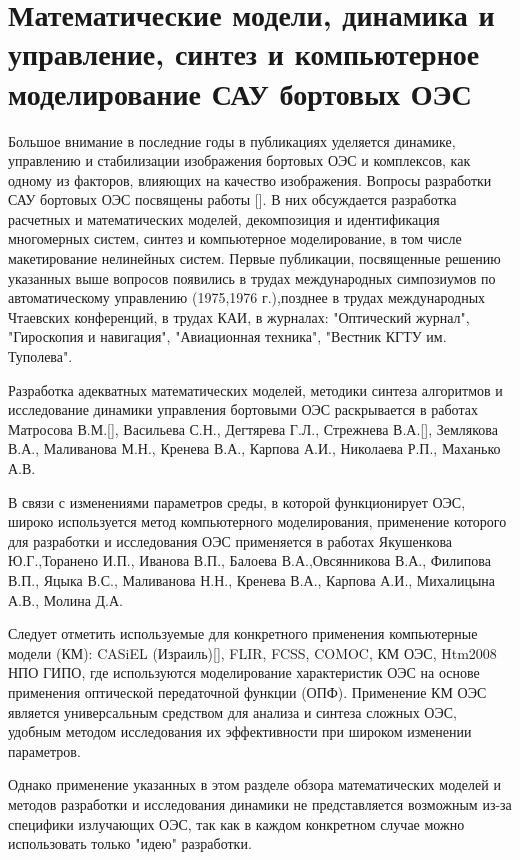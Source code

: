 \section{Математические модели, динамика и управление, синтез и компьютерное моделирование САУ бортовых ОЭС} \label{sec:ch1/modeling}

Большое внимание в последние годы в публикациях уделяется динамике, управлению и стабилизации изображения бортовых ОЭС и комплексов, как одному из факторов, влияющих на качество изображения. Вопросы разработки САУ бортовых ОЭС посвящены работы []. В них обсуждается разработка расчетных и математических моделей, декомпозиция и идентификация многомерных систем, синтез и компьютерное моделирование, в том числе макетирование нелинейных систем. Первые публикации, посвященные решению указанных выше вопросов появились в трудах международных симпозиумов по автоматическому управлению (1975,1976 г.),позднее в трудах международных Чтаевских конференций, в трудах КАИ, в журналах: "Оптический журнал", "Гироскопия и навигация", "Авиационная техника", "Вестник КГТУ им. Туполева".

Разработка адекватных математических моделей, методики синтеза алгоритмов и исследование динамики управления бортовыми ОЭС раскрывается в работах Матросова В.М.[], Васильева С.Н., Дегтярева Г.Л., Стрежнева В.А.[], Землякова В.А., Маливанова М.Н., Кренева В.А., Карпова А.И., Николаева Р.П., Маханько А.В.

В связи с изменениями параметров среды, в которой функционирует ОЭС, широко используется метод компьютерного моделирования, применение которого для разработки и исследования ОЭС применяется в работах Якушенкова Ю.Г.,Торанено И.П., Иванова В.П., Балоева В.А.,Овсянникова В.А., Филипова В.П., Яцыка В.С., Маливанова Н.Н., Кренева В.А., Карпова А.И., Михалицына А.В., Молина Д.А.

Следует отметить используемые для конкретного применения компьютерные модели (КМ): CASiEL (Израиль)[], FLIR, FCSS, COMOC, КМ ОЭС, Htm2008 НПО ГИПО, где используются моделирование характеристик ОЭС на основе применения оптической передаточной функции (ОПФ). Применение КМ ОЭС является универсальным средством для анализа  и синтеза сложных ОЭС, удобным методом исследования их эффективности при широком изменении параметров.

Однако применение указанных в этом разделе обзора  математических моделей и методов разработки и исследования динамики не представляется возможным из-за специфики излучающих ОЭС, так как в каждом конкретном случае можно использовать только "идею" разработки.

